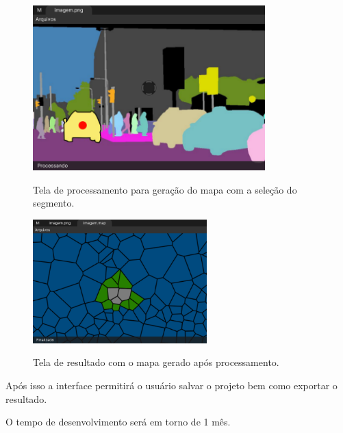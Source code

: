 \begin{figure}[H]
	\centering
    \caption{Tela de processamento para geração do mapa com a seleção do segmento.}
	\includegraphics[width=0.8\textwidth]{figures/tela_processando_2.png}
	\label{fig:tela_processando_2}
\end{figure}


\begin{figure}[H]
	\centering
    \caption{Tela de resultado com o mapa gerado após processamento.}
	\includegraphics[width=0.6\textwidth]{figures/tela_mapa.png}
	\label{fig:tela_mapa}
\end{figure}

Após isso a interface permitirá o usuário salvar o projeto bem como exportar o resultado.

O tempo de desenvolvimento será em torno de 1 mês.
